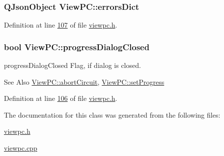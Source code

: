 \hypertarget{class_view_p_c_a26f90436aca32e5bad46f5e69a7e7e09}{
\subsubsection[{errors\-Dict}]{\setlength{\rightskip}{0pt plus 5cm}Q\-Json\-Object View\-P\-C\-::errors\-Dict}}\label{class_view_p_c_a26f90436aca32e5bad46f5e69a7e7e09}


Definition at line \hyperlink{viewpc_8h_source_l00107}{107} of file \hyperlink{viewpc_8h_source}{viewpc.\-h}.

\hypertarget{class_view_p_c_add8c82aa2b0b934212aa5bde9277ab36}{
\subsubsection[{progress\-Dialog\-Closed}]{\setlength{\rightskip}{0pt plus 5cm}bool View\-P\-C\-::progress\-Dialog\-Closed}}\label{class_view_p_c_add8c82aa2b0b934212aa5bde9277ab36}


progress\-Dialog\-Closed Flag, if dialog is closed. 

\begin{DoxySeeAlso}{See Also}
\hyperlink{class_view_p_c_ad7ba2fcf1d17862de15e32432823f7b0}{View\-P\-C\-::abort\-Circuit}, \hyperlink{class_view_p_c_a9c32a1fdb6ead84e5ada8fba8860c7ed}{View\-P\-C\-::set\-Progress} 
\end{DoxySeeAlso}


Definition at line \hyperlink{viewpc_8h_source_l00106}{106} of file \hyperlink{viewpc_8h_source}{viewpc.\-h}.



The documentation for this class was generated from the following files\-:\begin{DoxyCompactItemize}
\item 
\hyperlink{viewpc_8h}{viewpc.\-h}\item 
\hyperlink{viewpc_8cpp}{viewpc.\-cpp}\end{DoxyCompactItemize}
